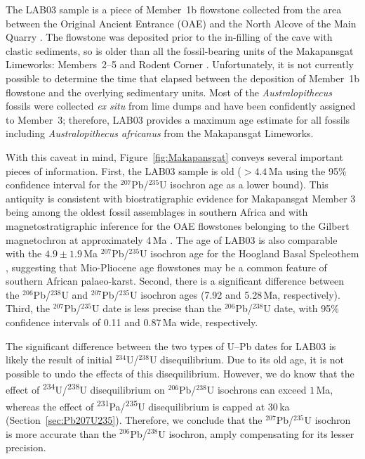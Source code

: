 \documentclass[11pt]{article}
\begin{document}
The LAB03 sample is a piece of Member~1b flowstone collected from the
area between the Original Ancient Entrance (OAE) and the North Alcove
of the Main Quarry \citep{walker2005,reed2022}. The flowstone was
deposited prior to the in-filling of the cave with clastic sediments,
so is older than all the fossil-bearing units of the Makapansgat
Limeworks: Members~2--5 and Rodent Corner
\citep{maguire1984,reed2022}. Unfortunately, it is not currently
possible to determine the time that elapsed between the deposition of
Member~1b flowstone and the overlying sedimentary units. Most of the
\emph{Australopithecus} fossils were collected \emph{ex situ} from
lime dumps and have been confidently assigned to Member~3; therefore,
LAB03 provides a maximum age estimate for all fossils including
\emph{Australopithecus africanus} from the Makapansgat Limeworks.

With this caveat in mind, Figure~\ref{fig:Makapansgat} conveys several
important pieces of information. First, the LAB03 sample is old
($>4.4$\,Ma using the 95\% confidence interval for the
${}^{207}$Pb/$^{235}$U isochron age as a lower bound). This antiquity
is consistent with biostratigraphic evidence for Makapansgat Member 3
being among the oldest fossil assemblages in southern Africa
\citep{mckee1993,frost2022} and with magnetostratigraphic inference
for the OAE flowstones belonging to the Gilbert magnetochron at
approximately 4\,Ma \citep{hopley2007}. The age of LAB03 is also
comparable with the $4.9 \pm 1.9$\,Ma ${}^{207}$Pb/$^{235}$U isochron
age for the Hoogland Basal Speleothem \citep{hopley2019}, suggesting
that Mio-Pliocene age flowstones may be a common feature of southern
African palaeo-karst. Second, there is a significant difference
between the ${}^{206}$Pb/$^{238}$U and ${}^{207}$Pb/$^{235}$U isochron
ages (7.92 and 5.28\,Ma, respectively). Third, the
${}^{207}$Pb/$^{235}$U date is less precise than the
${}^{206}$Pb/$^{238}$U date, with 95\% confidence intervals of 0.11
and 0.87\,Ma wide, respectively.

The significant difference between the two types of U--Pb dates for
LAB03 is likely the result of initial ${}^{234}$U/${}^{238}$U
disequilibrium. Due to its old age, it is not possible to undo the
effects of this disequilibrium. However, we do know that the effect of
\textsuperscript{234}U/\textsuperscript{238}U disequilibrium on
${}^{206}$Pb/$^{238}$U isochrons can exceed $1$\,Ma, whereas the
effect of \textsuperscript{231}Pa/\textsuperscript{235}U
disequilibrium is capped at 30\,ka
(Section~\ref{sec:Pb207U235}). Therefore, we conclude that the
${}^{207}$Pb/$^{235}$U isochron is more accurate than the
${}^{206}$Pb/$^{238}$U isochron, amply compensating for its lesser
precision.
\end{document}
